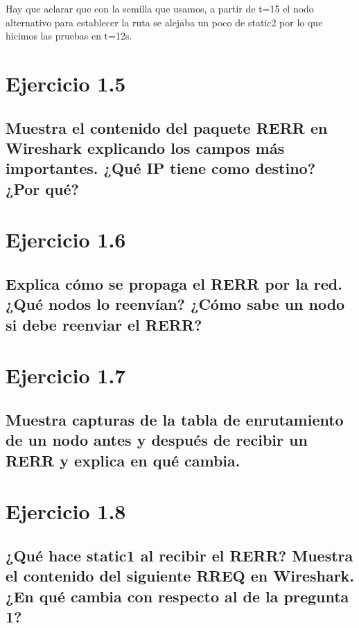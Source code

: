 Hay que aclarar que con la semilla que usamos, a partir de t=15 el nodo alternativo para establecer la ruta se alejaba un poco de static2 por lo que hicimos las pruebas en t=12s.

\section{Ejercicio 1.5}

\subsection{Muestra el contenido del paquete RERR en Wireshark explicando los campos más importantes. ¿Qué IP
tiene como destino? ¿Por qué?}

\section{Ejercicio 1.6}

\subsection{Explica cómo se propaga el RERR por la red. ¿Qué nodos lo reenvían? ¿Cómo sabe un nodo si debe reenviar
el RERR?}

\section{Ejercicio 1.7} 

\subsection{Muestra capturas de la tabla de enrutamiento de un nodo antes y después de recibir un RERR y explica en
qué cambia.}

\section{Ejercicio 1.8}

\subsection{¿Qué hace static1 al recibir el RERR? Muestra el contenido del siguiente RREQ en Wireshark. ¿En qué cambia
con respecto al de la pregunta 1?}